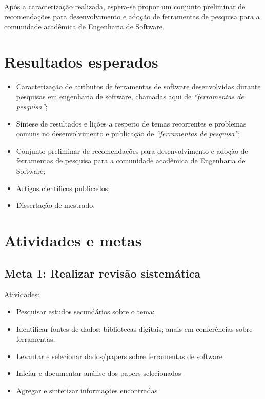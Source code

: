 \documentclass[12pt]{article}
\begin{document}
Após a caracterização realizada, espera-se propor um conjunto preliminar de
recomendações para desenvolvimento e adoção de ferramentas de pesquisa para a
comunidade acadêmica de Engenharia de Software.

\section{Resultados esperados}

\begin{itemize}
  \item Caracterização de atributos de ferramentas de software desenvolvidas
    durante pesquisas em engenharia de software, chamadas aqui de {\it “ferramentas
    de pesquisa”};
  \item Síntese de resultados e lições a respeito de temas recorrentes e
    problemas comuns no desenvolvimento e publicação de {\it “ferramentas de
    pesquisa”};
  \item Conjunto preliminar de recomendações para desenvolvimento e adoção de
    ferramentas de pesquisa para a comunidade acadêmica de Engenharia de
    Software;
  \item Artigos científicos publicados;
  \item Dissertação de mestrado.
\end{itemize}


\section{Atividades e metas}

\subsection{Meta 1: Realizar revisão sistemática}

Atividades:

\begin{itemize}
  \item Pesquisar estudos secundários sobre o tema;
  \item Identificar fontes de dados: bibliotecas digitais; anais em
    conferências sobre ferramentas;
  \item Levantar e selecionar dados/papers sobre ferramentas de software
  \item Iniciar e documentar análise dos papers selecionados
  \item Agregar e sintetizar informações encontradas
\end{itemize}
\end{document}
